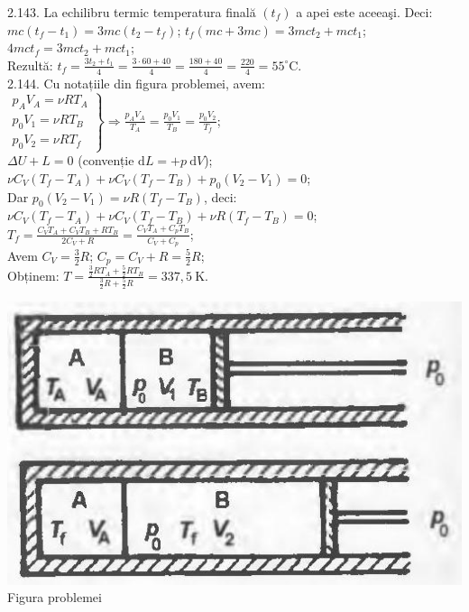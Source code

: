 2.143. La echilibru termic temperatura finală $\left(t_{f}\right)$ a apei este aceeaşi. Deci:\\ $m c\left(t_{f}-t_{1}\right)=3 m c\left(t_{2}-t_{f}\right)$; \quad $t_{f}(m c+3 m c)=3 m c t_{2}+m c t_{1}$;\\ $4 m c t_{f}=3 m c t_{2}+m c t_{1}$;\\ Rezultă: $t_{f}=\frac{3 t_{2}+t_{1}}{4}=\frac{3 \cdot 60+40}{4}=\frac{180+40}{4}=\frac{220}{4}=55^{\circ} \mathrm{C}$.\\

2.144. Cu notațiile din figura problemei, avem:\\ $\left.\begin{array}{l} p_{A} V_{A}=\nu R T_{A}\\ p_{0} V_{1}=\nu R T_{B}\\ p_{0} V_{2}=\nu R T_{f} \end{array}\right\} \Rightarrow \frac{p_{A} V_{A}}{T_{A}}=\frac{p_{0} V_{1}}{T_{B}}=\frac{p_{0} V_{2}}{T_{f}}$;\\ $\Delta U+L=0$ (convenție $\mathrm{d} L=+p \mathrm{~d} V$);\\ $\nu C_{V}\left(T_{f}-T_{A}\right)+\nu C_{V}\left(T_{f}-T_{B}\right)+p_{0}\left(V_{2}-V_{1}\right)=0$;\\ Dar $p_{0}\left(V_{2}-V_{1}\right)=\nu R\left(T_{f}-T_{B}\right)$, deci:\\ $\nu C_{V}\left(T_{f}-T_{A}\right)+\nu C_{V}\left(T_{f}-T_{B}\right)+\nu R\left(T_{f}-T_{B}\right)=0$;\\ $T_{f}=\frac{C_{V} T_{A}+C_{V} T_{B}+R T_{B}}{2 C_{V}+R}=\frac{C_{V} T_{A}+C_{p} T_{B}}{C_{V}+C_{p}}$;\\ Avem $C_{V}=\frac{3}{2} R$; \quad $C_{p}=C_{V}+R=\frac{5}{2} R$;\\ Obținem: $T=\frac{\frac{3}{2} R T_{A}+\frac{5}{2} R T_{B}}{\frac{3}{2} R+\frac{5}{2} R}=337,5 \mathrm{~K}$.\\ \begin{center} \includegraphics[width=0.4\linewidth]{images/2025_07_01_5b3ff9fa0d508c8e9f17g-299}\\ Figura problemei \end{center}\\

